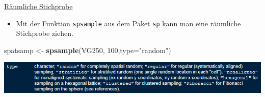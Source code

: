 \documentclass[ignorenonframetext,]{beamer}
\newenvironment{Shaded}{\begin{snugshade}}{\end{snugshade}}
\newcommand{\DataTypeTok}[1]{\textcolor[rgb]{0.13,0.29,0.53}{#1}}
\newcommand{\DecValTok}[1]{\textcolor[rgb]{0.00,0.00,0.81}{#1}}
\newcommand{\KeywordTok}[1]{\textcolor[rgb]{0.13,0.29,0.53}{\textbf{#1}}}
\newcommand{\NormalTok}[1]{#1}
\newcommand{\StringTok}[1]{\textcolor[rgb]{0.31,0.60,0.02}{#1}}
\providecommand{\tightlist}{%
  \setlength{\itemsep}{0pt}\setlength{\parskip}{0pt}}
\begin{document}
\begin{frame}[fragile]{\href{https://www.rdocumentation.org/packages/sp/versions/1.3-1/topics/spsample}{Räumliche
Stichprobe}}
\protect\hypertarget{raumliche-stichprobe}{}

\begin{itemize}
\tightlist
\item
  Mit der Funktion \texttt{spsample} aus dem Paket \texttt{sp} kann man
  eine räumliche Stichprobe ziehen.
\end{itemize}

\begin{Shaded}
\begin{Highlighting}[]
\NormalTok{spatsamp <-}\StringTok{ }\KeywordTok{spsample}\NormalTok{(VG250, }\DecValTok{100}\NormalTok{,}\DataTypeTok{type=}\StringTok{"random"}\NormalTok{)}
\end{Highlighting}
\end{Shaded}

\includegraphics{figure/spsample_type.PNG}

\end{frame}
\end{document}
